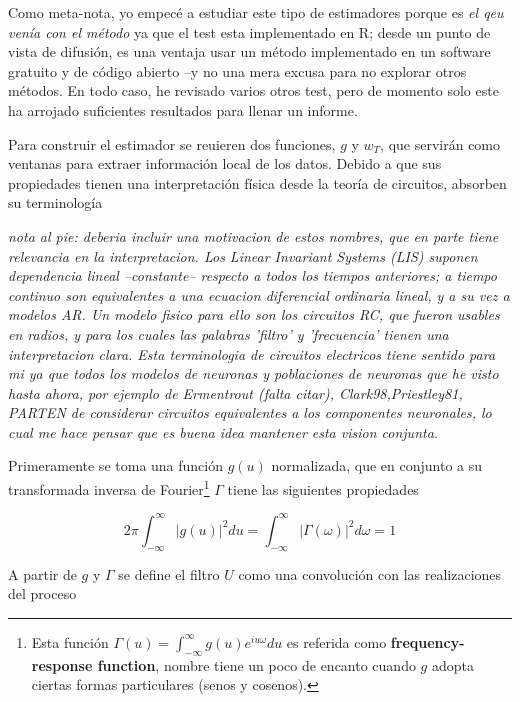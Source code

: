 Como meta-nota, yo empec\'e a estudiar este tipo de estimadores porque es \textit{el qeu ven\'ia
con el m\'etodo} ya que el test esta implementado en R; desde un punto de vista de difusi\'on,
es una ventaja usar un m\'etodo implementado en un software gratuito y de c\'odigo abierto --y
no una mera excusa para no explorar otros m\'etodos. En todo caso, he revisado varios otros test,
pero de momento solo este ha arrojado suficientes resultados para llenar un informe.

Para construir el estimador se reuieren dos funciones, $g$ y $w_T$, que servir\'an como ventanas
para extraer informaci\'on local de los datos. Debido a que sus propiedades tienen una interpretaci\'on
f\'isica desde la teor\'ia de circuitos, absorben su terminolog\'ia

\textit{
nota al pie: deberia incluir una motivacion de estos nombres,
que en parte tiene relevancia en la interpretacion. Los 
Linear Invariant Systems (LIS) suponen dependencia lineal
--constante-- respecto a todos los tiempos anteriores; 
a tiempo continuo son equivalentes a una ecuacion diferencial ordinaria lineal,
y a su vez a modelos AR. Un modelo fisico para ello son los circuitos RC, que
fueron usables en radios, y para los cuales las palabras 'filtro' y 'frecuencia'
tienen una interpretacion clara. Esta terminologia de circuitos electricos tiene sentido
para mi ya que todos los modelos de neuronas y poblaciones de neuronas que he visto hasta ahora,
por ejemplo de Ermentrout (falta citar), {Clark98,Priestley81}, PARTEN de considerar
circuitos equivalentes a los componentes neuronales, lo cual me hace pensar que es buena idea
mantener esta vision conjunta.
}

Primeramente se toma una funci\'on $g(u)$ normalizada, que en conjunto a su
transformada inversa de Fourier\footnote{Esta funci\'on 
$\Gamma(u) = \int_{-\infty}^{\infty} g(u) e^{i u \omega} du$
es referida como
\textbf{frequency-response function}, nombre tiene un poco de encanto cuando
$g$ adopta ciertas formas particulares (senos y cosenos).} 
$\Gamma$ tiene las siguientes propiedades

\begin{equation*}
2\pi \int_{-\infty}^{\infty} \lvert g(u) \lvert^{2} du 
= 
\int_{-\infty}^{\infty} \lvert \Gamma(\omega) \lvert^{2} d\omega
= 1
\end{equation*}


A partir de $g$ y $\Gamma$ se define el filtro $U$ como una convoluci\'on
con las realizaciones del proceso

